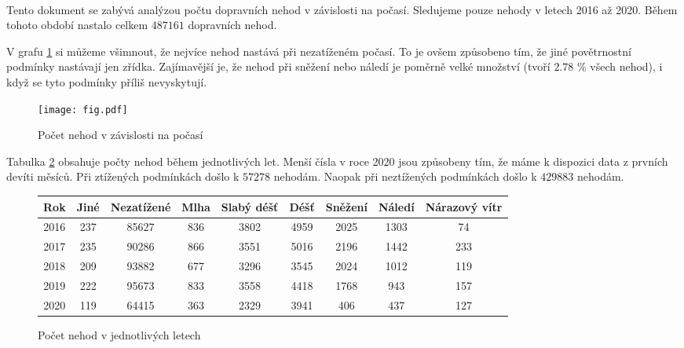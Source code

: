 \documentclass[a4paper,11pt]{article}
\begin{document}
	\\
	
	\vspace{1em}
	
	Tento dokument se zabývá analýzou počtu dopravních nehod v závislosti na počasí. Sledujeme pouze nehody v letech 2016 až 2020. Během tohoto období nastalo celkem $487161$ dopravních nehod.
	
	V grafu \ref{figure:graph} si můžeme všimnout, že nejvíce nehod nastává při nezatíženém počasí. To je ovšem způsobeno tím, že jiné povětrnostní podmínky nastávají jen zřídka. Zajímavější je, že nehod při sněžení nebo náledí je poměrně velké množství (tvoří $2.78$ \% všech nehod), i když se tyto podmínky příliš nevyskytují.
	
	\begin{figure}[H]
		\caption{Počet nehod v závislosti na počasí}
		\label{figure:graph}
		\centering
		\texttt{[image: fig.pdf]}
	\end{figure}

	Tabulka \ref{figure:table} obsahuje počty nehod během jednotlivých let. Menší čísla v roce 2020 jsou způsobeny tím, že máme k dispozici data z prvních devíti měsíců. Při ztížených podmínkách došlo k $57278$ nehodám. Naopak při neztížených podmínkách došlo k $429883$ nehodám.
	
	\begin{figure}[H]
		\caption{Počet nehod v jednotlivých letech}
		\label{figure:table}
		\begin{center}	
			\begin{tabular}{ |c|c|c|c|c|c|c|c|c| }
				\hline
				Rok & Jiné & Nezatížené & Mlha & Slabý déšť & Déšť & Sněžení & Náledí & Nárazový vítr \\
				\hline
				2016 & 237 & 85627 & 836 & 3802 & 4959 & 2025 & 1303 & 74 \\
				\hline
				2017 & 235 & 90286 & 866 & 3551 & 5016 & 2196 & 1442 & 233 \\
				\hline
				2018 & 209 & 93882 & 677 & 3296 & 3545 & 2024 & 1012 & 119 \\
				\hline
				2019 & 222 & 95673 & 833 & 3558 & 4418 & 1768 & 943 & 157 \\
				\hline
				2020 & 119 & 64415 & 363 & 2329 & 3941 & 406 & 437 & 127 \\
				\hline
			\end{tabular}
		\end{center}
	\end{figure}
\end{document}
